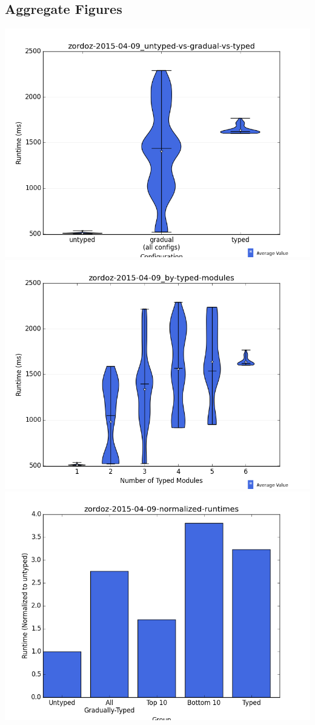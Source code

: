 \documentclass{article}
\begin{document}
\subsection{Aggregate Figures}
\includegraphics[width=\textwidth]{zordoz-2015-04-09_untyped-vs-gradual-vs-typed-violin.png}
\includegraphics[width=\textwidth]{zordoz-2015-04-09_by-typed-modules-violin.png}
\includegraphics[width=\textwidth]{zordoz-2015-04-09-normalized-runtimes-bar.png}
\end{document}
